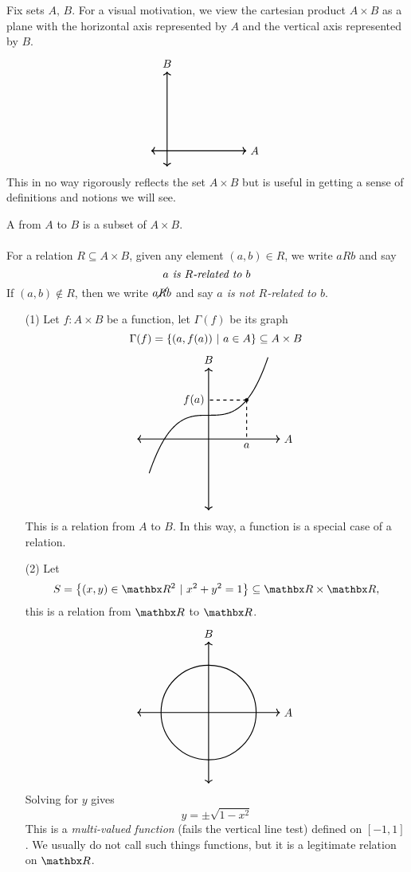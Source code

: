 \vspace*{1em}

Fix sets $A,\,B$. For a visual motivation, we view the cartesian product $A \times B$ as a plane with the horizontal axis represented by $A$ and the vertical axis represented by $B$. 
\[\begin{tikzpicture}
	\draw[<->,thick] (-0.5,0) -- (2.5,0) node[right] {$A$};
	\draw[<->,thick] (0,-0.5) -- (0,2.5) node[above] {$B$};
\end{tikzpicture}\]
This in no way rigorously reflects the set $A \times B$ but is useful in getting a sense of definitions and notions we will see.

\vspace*{1em}

\begin{definition}
A  from $A$ to $B$ is a subset of $A \times B$.\\
\\
For a relation $R \subseteq A \times B$, given any element $(a,b) \in R$, we write $aRb$ and say \[\text{\emph{$a$ is $R$-related to $b$}}\]
If $(a,b) \notin R$, then we write $a \cancel{R} b$ and say \emph{$a$ is not $R$-related to $b$}.
\end{definition}

\vspace*{1em}

\begin{example}\hfill
\begin{itemize}[itemsep=1em]
\item[(1)] Let $f: A \times B$ be a function, let $\Gamma(f)$ be its graph
\[\Gamma(f) = \left\{(a,f(a))\ \vert\ a \in A\right\} \subseteq A \times B\]
\[\begin{tikzpicture}[scale=1.5]
	\draw[<->,thick] (-1.5,0) -- (1.5,0) node[right] {$A$};
	\draw[<->,thick] (0,-1.5) -- (0,1.5) node[above] {$B$};
	\draw[thick, domain=-1.25:1.25, samples=200, variable=\x] plot (\x, {(5*\x^3 + 4)/8});
	\filldraw (0.8,0.82) circle (1pt);
	\draw[thick,dashed] (0.8,0.82) -- (0,0.82) node[left] {$f(a)$};
	\draw[thick,dashed] (0.8,0.82) -- (0.8,0) node[below] {$a$};
\end{tikzpicture}\]
This is a relation from $A$ to $B$. In this way, a function is a special case of a relation.

\item[(2)] Let 
\[S = \setp{(x,y) \in \rr^2}{x^2 + y^2 = 1} \subseteq \rr \times \rr,\]
this is a relation from $\rr$ to $\rr$.
\[\begin{tikzpicture}[scale=1.5]
	\draw[<->,thick] (-1.5,0) -- (1.5,0) node[right] {$A$};
	\draw[<->,thick] (0,-1.5) -- (0,1.5) node[above] {$B$};
	\draw[thick] (0,0) circle (1);
\end{tikzpicture}\]
Solving for $y$ gives \[y = \pm \sqrt{1 - x^2}\]
This is a \emph{multi-valued function} (fails the vertical line test) defined on $[-1,1]$. We usually do not call such things functions, but it is a legitimate relation on $\rr$.
\end{itemize}
\end{example}

